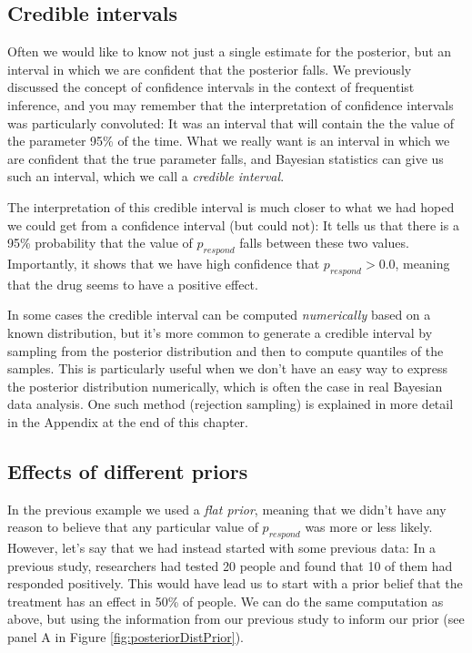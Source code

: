 \documentclass[12pt,]{book}
\theoremstyle{definition}
\theoremstyle{definition}
\theoremstyle{definition}
\theoremstyle{remark}
\begin{document}
\hypertarget{credible-intervals}{%
\subsection{Credible intervals}\label{credible-intervals}}

Often we would like to know not just a single estimate for the posterior, but an interval in which we are confident that the posterior falls. We previously discussed the concept of confidence intervals in the context of frequentist inference, and you may remember that the interpretation of confidence intervals was particularly convoluted: It was an interval that will contain the the value of the parameter 95\% of the time. What we really want is an interval in which we are confident that the true parameter falls, and Bayesian statistics can give us such an interval, which we call a \emph{credible interval}.

The interpretation of this credible interval is much closer to what we had hoped we could get from a confidence interval (but could not): It tells us that there is a 95\% probability that the value of \(p_{respond}\) falls between these two values. Importantly, it shows that we have high confidence that \(p_{respond} > 0.0\), meaning that the drug seems to have a positive effect.

In some cases the credible interval can be computed \emph{numerically} based on a known distribution, but it's more common to generate a credible interval by sampling from the posterior distribution and then to compute quantiles of the samples. This is particularly useful when we don't have an easy way to express the posterior distribution numerically, which is often the case in real Bayesian data analysis. One such method (rejection sampling) is explained in more detail in the Appendix at the end of this chapter.

\hypertarget{effects-of-different-priors}{%
\subsection{Effects of different priors}\label{effects-of-different-priors}}

In the previous example we used a \emph{flat prior}, meaning that we didn't have any reason to believe that any particular value of \(p_{respond}\) was more or less likely. However, let's say that we had instead started with some previous data: In a previous study, researchers had tested 20 people and found that 10 of them had responded positively. This would have lead us to start with a prior belief that the treatment has an effect in 50\% of people. We can do the same computation as above, but using the information from our previous study to inform our prior (see panel A in Figure \ref{fig:posteriorDistPrior}).
\end{document}
